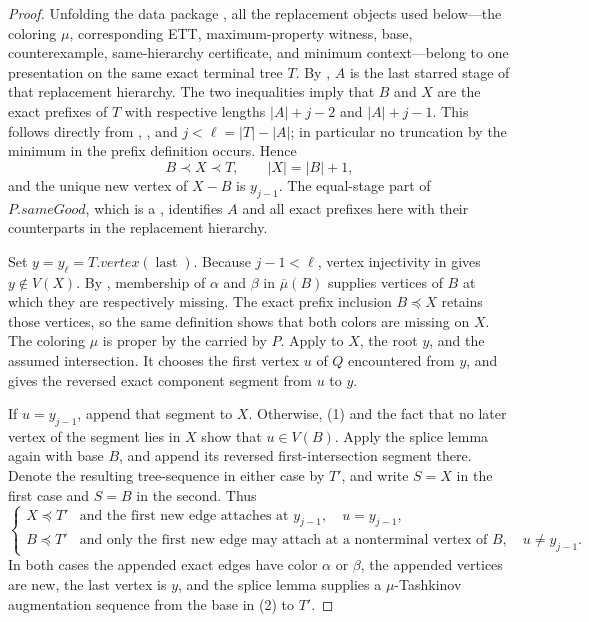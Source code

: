 \begin{proof}
Unfolding the data package
, all the replacement objects
used below---the coloring \(\mu\), corresponding ETT, maximum-property
witness, base, counterexample, same-hierarchy certificate, and minimum
context---belong to one presentation on the same exact terminal tree \(T\).
By , \(A\) is the last starred stage of that
replacement hierarchy.  The two inequalities imply that \(B\) and \(X\)
are the exact prefixes of
\(T\) with respective lengths \(|A|+j-2\) and \(|A|+j-1\).  This follows
directly from ,
, and \(j<\ell=|T|-|A|\); in particular
no truncation by the minimum in the prefix definition occurs.  Hence
\[
 B\prec X\prec T,\qquad |X|=|B|+1,                           \tag{1}
\]
and the unique new vertex of \(X-B\) is \(y_{j-1}\).  The equal-stage
part of \(P.\mathit{sameGood}\), which is a
, identifies \(A\) and all exact prefixes here
with their counterparts in the replacement hierarchy.

Set \(y=y_\ell=T.\mathit{vertex}(\operatorname{last})\).  Because
\(j-1<\ell\), vertex injectivity in  gives
\(y\notin V(X)\).  By , membership of
\(\alpha\) and \(\beta\) in \(\overline\mu(B)\) supplies vertices of
\(B\) at which they are respectively missing.  The exact prefix inclusion
\(B\preccurlyeq X\) retains those vertices, so the same definition shows
that both colors are missing on \(X\).  The coloring \(\mu\) is proper by the
 carried by \(P\).
Apply  to \(X\), the root
\(y\), and the assumed intersection.  It chooses the first vertex \(u\)
of \(Q\) encountered from \(y\), and gives the reversed exact component
segment from \(u\) to \(y\).

If \(u=y_{j-1}\), append that segment to \(X\).  Otherwise, (1) and the
fact that no later vertex of the segment lies in \(X\) show that
\(u\in V(B)\).  Apply the splice lemma again with base \(B\), and append
its reversed first-intersection segment there.  Denote the resulting
tree-sequence in either case by \(T'\), and write \(S=X\) in the first case
and \(S=B\) in the second.  Thus
\[
 \begin{cases}
 X\preccurlyeq T'&\text{and the first new edge attaches at }y_{j-1},
       \quad u=y_{j-1},\\
 B\preccurlyeq T'&\text{and only the first new edge may attach at a
       nonterminal vertex of }B,\quad u\ne y_{j-1}.
 \end{cases}                                                  \tag{2}
\]
In both cases the appended exact edges have color \(\alpha\) or \(\beta\),
the appended vertices are new, the last vertex is \(y\), and the splice
lemma supplies a \(\mu\)-Tashkinov augmentation sequence from the base in
(2) to \(T'\).


\end{proof}
